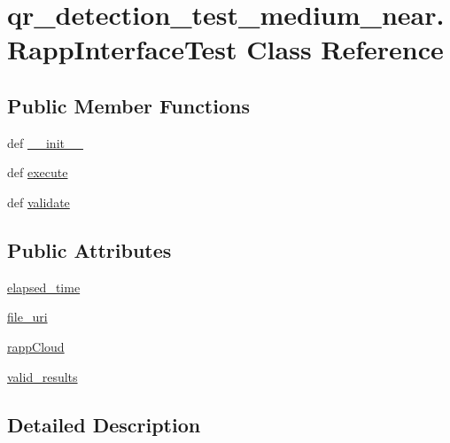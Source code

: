 \hypertarget{classqr__detection__test__medium__near_1_1RappInterfaceTest}{\section{qr\-\_\-detection\-\_\-test\-\_\-medium\-\_\-near.\-Rapp\-Interface\-Test Class Reference}
\label{classqr__detection__test__medium__near_1_1RappInterfaceTest}
}
\subsection*{Public Member Functions}
\begin{DoxyCompactItemize}
\item 
def \hyperlink{classqr__detection__test__medium__near_1_1RappInterfaceTest_aab49a236617b958743d488ae4ccd0350}{\-\_\-\-\_\-init\-\_\-\-\_\-}
\item 
def \hyperlink{classqr__detection__test__medium__near_1_1RappInterfaceTest_ab082c51ebc7d2718f953135a5743cd35}{execute}
\item 
def \hyperlink{classqr__detection__test__medium__near_1_1RappInterfaceTest_aa04fb0131ff2c6fdc030b5dfdd139c02}{validate}
\end{DoxyCompactItemize}
\subsection*{Public Attributes}
\begin{DoxyCompactItemize}
\item 
\hyperlink{classqr__detection__test__medium__near_1_1RappInterfaceTest_ac038deafc8d7d747a2c79a3b92d63fa3}{elapsed\-\_\-time}
\item 
\hyperlink{classqr__detection__test__medium__near_1_1RappInterfaceTest_ac8b41fee0e4fc9c5bda1367bba426a80}{file\-\_\-uri}
\item 
\hyperlink{classqr__detection__test__medium__near_1_1RappInterfaceTest_adef1d8e835c3cc392729e7f5cfbfbcf0}{rapp\-Cloud}
\item 
\hyperlink{classqr__detection__test__medium__near_1_1RappInterfaceTest_a170e7b4dbd6ff937ceb28b9a15732ade}{valid\-\_\-results}
\end{DoxyCompactItemize}


\subsection{Detailed Description}


